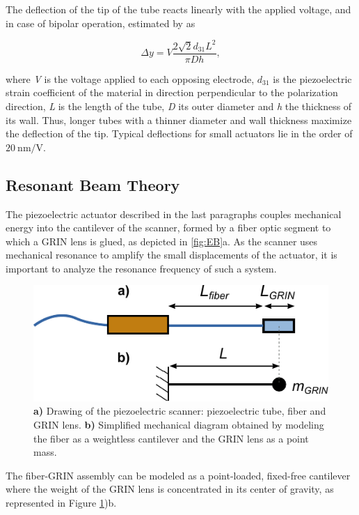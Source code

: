 {The deflection of the tip of the tube reacts linearly with the applied voltage, and in case of bipolar operation, estimated by \cite{Chen} as

\begin{equation}
\Delta y = V  \frac{2 \sqrt{2} d_{31} L^2}{\pi D h},
\end{equation}

where \textit{V} is the voltage applied to each opposing electrode, $d_{31}$ is the piezoelectric strain coefficient of the material in direction perpendicular to the polarization direction, \textit{L} is the length of the tube, \textit{D} its outer diameter and \textit{h} the thickness of its wall. Thus, longer tubes with a thinner diameter and wall thickness maximize the deflection of the tip. Typical deflections for small actuators lie in the order of $\SI{20}{\nano\meter / \volt}$.


\subsection{Resonant Beam Theory}
\label{sec:EB}
The piezoelectric actuator described in the last paragraphs couples mechanical energy into the cantilever of the scanner, formed by a fiber optic segment to which a GRIN lens is glued, as depicted in \autoref{fig:EB}a. As the scanner uses mechanical resonance to amplify the small displacements of the actuator, it is important to analyze the resonance frequency of such a system. 

\begin{figure}[h!]\centering
      \includegraphics{figures/20_Theory/Mechanical/EB.pdf}
      \caption{\textbf{a)} Drawing of the piezoelectric scanner: piezoelectric tube, fiber and GRIN lens. 
      \textbf{b)} Simplified mechanical diagram obtained by modeling the fiber as a weightless cantilever and the GRIN lens as a point mass.}
      \label{fig:EB}
\end{figure}

The fiber-GRIN assembly can be modeled as a point-loaded, fixed-free cantilever where the weight of the GRIN lens is concentrated in its center of gravity, as represented in Figure \ref{fig:EB})b. 

}
